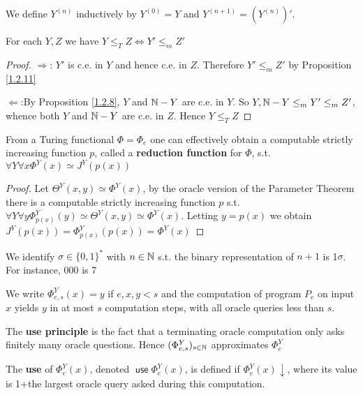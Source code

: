 \documentclass[11pt]{article}
\DeclareMathOperator{\use}{\textsf{use}}
\begin{document}
\begin{definition}[]
We define \(Y^{(n)}\) inductively by \(Y^{(0)}=Y\) and \(Y^{(n+1)}=(Y^{(n)})'\).
\end{definition}

\begin{proposition}[]
For each \(Y,Z\) we have \(Y\le_TZ\Leftrightarrow Y'\le_mZ'\)
\end{proposition}

\begin{proof}
\(\Rightarrow\): \(Y'\) is c.e. in \(Y\) and hence c.e. in \(Z\). Therefore \(Y'\le_mZ'\) by Proposition \ref{1.2.11}

\(\Leftarrow\):By Proposition \ref{1.2.8}, \(Y\) and \(\mathbb{N}-Y\) are c.e. in \(Y\). So \(Y,\mathbb{N}-Y\le_mY'\le_mZ'\),
whence both \(Y\) and \(\mathbb{N}-Y\) are c.e. in \(Z\). Hence \(Y\le_TZ\)
\end{proof}

\begin{fact}[]
From a Turing functional \(\Phi=\Phi_e\) one can effectively obtain a computable strictly increasing
function \(p\), called a \textbf{reduction function} for \(\Phi\), s.t. \(\forall Y\forall x\Phi^Y(x)\simeq J^Y(p(x))\)
\end{fact}

\begin{proof}
Let \(\Theta^Y(x,y)\simeq\Phi^Y(x)\), by the oracle version of the Parameter Theorem there is a computable
strictly increasing function \(p\) s.t. \(\forall Y\forall y\Phi_{p(x)}^Y(y)\simeq\Theta^Y(x,y)\simeq\Phi^Y(x)\).
Letting \(y=p(x)\) we obtain \(J^Y(p(x))=\Phi^Y_{p(x)}(p(x))=\Phi^Y(x)\)
\end{proof}

We identify \(\sigma\in\{0,1\}^*\) with \(n\in\mathbb{N}\) s.t. the binary representation of \(n+1\) is 1\(\sigma\). For
instance, 000 is 7

\begin{definition}[]
We write \(\Phi_{e,s}^Y(x)=y\) if \(e,x,y<s\) and the computation of program \(P_e\) on input \(x\)
yields \(y\) in at most \(s\) computation steps, with all oracle queries less than \(s\).
\end{definition}

The \textbf{use principle} is the fact that a terminating oracle computation only asks finitely many
oracle questions. Hence \((\Phi_{e,s}^Y)_{s\in\mathbb{N}}\) approximates \(\Phi_e^Y\)

\begin{definition}[]
The \textbf{use} of \(\Phi_e^Y(x)\), denoted \(\use\Phi_e^Y(x)\), is defined if \(\Phi_e^Y(x)\downarrow\), where its value is
1+the largest oracle query asked during this computation.
\end{definition}
\end{document}
